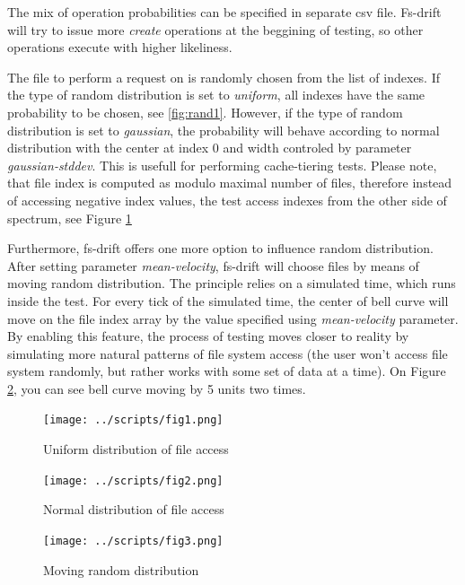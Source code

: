 \documentclass[
  color, %
  table, %
  lof,   %
  lot,   %
]{fithesis3}
\begin{document}
The mix of operation probabilities can be specified in separate csv file. Fs-drift will try to issue more \textit{create} operations at the beggining of testing, so other operations execute with higher likeliness.

The file to perform a request on is randomly chosen from the list of indexes. If the type of random distribution is set to \textit{uniform}, all indexes have the same probability to be chosen, see \ref{fig:rand1}. However, if the type of random distribution is set to \textit{gaussian}, the probability will behave according to normal distribution with the center at index 0 and width controled by parameter \textit{gaussian-stddev}. This is usefull for performing cache-tiering tests. Please note, that file index is computed as modulo maximal number of files, therefore instead of accessing negative index values, the test access indexes from the other side of spectrum, see Figure \ref{fig:rand2}

Furthermore, fs-drift offers one more option to influence random distribution. After setting parameter \textit{mean-velocity}, fs-drift will choose files by means of moving random distribution. The principle relies on a simulated time, which runs inside the test. For every tick of the simulated time, the center of bell curve will move on the file index array by the value specified using \textit{mean-velocity} parameter. By enabling this feature, the process of testing moves closer to reality by simulating more natural patterns of file system access (the user won't access file system randomly, but rather works with some set of data at a time). On Figure \ref{fig:rand3}, you can see bell curve moving by 5 units two times.

\begin{figure}[!htb]
    \centering
    \begin{minipage}{\textwidth}
        \centering
        \texttt{[image: ../scripts/fig1.png]}
        \caption{Uniform distribution of file access}
\label{fig:rand1}
    \end{minipage}\hfill
    \begin{minipage}{\textwidth}
        \centering
        \texttt{[image: ../scripts/fig2.png]}
        \caption{Normal distribution of file access}

\label{fig:rand2}
    \end{minipage}

\end{figure}
\begin{figure}
    \begin{minipage}{\textwidth}
        \centering
        \texttt{[image: ../scripts/fig3.png]}
        \caption{Moving random distribution}
\label{fig:rand3}
    \end{minipage}
\end{figure}
\end{document}
